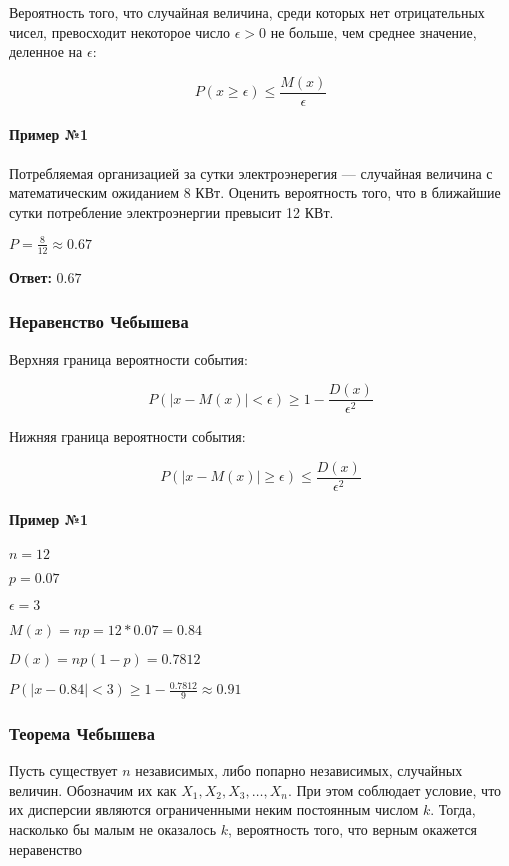 \documentclass{article}
\begin{document}
Вероятность того, что случайная величина, среди которых нет отрицательных чисел, превосходит некоторое число $\epsilon > 0$ не больше, чем среднее значение, деленное на $\epsilon$:

$$P(x \ge \epsilon) \le \frac{M(x)}{\epsilon}$$

\paragraph{Пример №1}

Потребляемая организацией за сутки электроэнерегия — случайная величина с математическим ожиданием 8 КВт. Оценить вероятность того, что в ближайшие сутки потребление электроэнергии превысит 12 КВт.

$P = \frac{8}{12} \approx 0.67$

\textbf{Ответ:} $0.67$

\subsubsection{Неравенство Чебышева}

Верхняя граница вероятности события:

$$P(|x - M(x)| < \epsilon) \ge 1 - \frac{D(x)}{\epsilon^2}$$

Нижняя граница вероятности события:

$$P(|x - M(x)| \ge \epsilon) \le \frac{D(x)}{\epsilon^2}$$

\paragraph{Пример №1}

$n = 12$

$p = 0.07$

$\epsilon = 3$

$M(x) = np = 12 * 0.07 = 0.84$

$D(x) = np(1 - p) = 0.7812$

$P(|x - 0.84| < 3) \ge 1 - \frac{0.7812}{9} \approx 0.91$

\subsubsection{Теорема Чебышева}

Пусть существует $n$ независимых, либо попарно независимых, случайных величин. Обозначим их как $X_1, X_2, X_3, \dots, X_n$. При этом соблюдает условие, что их дисперсии являются ограниченными неким постоянным числом $k$. Тогда, насколько бы малым не оказалось $k$, вероятность того, что верным окажется неравенство
\end{document}
